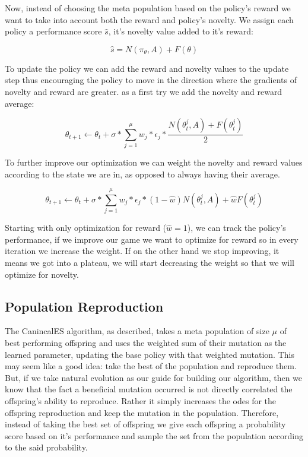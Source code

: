 \documentclass[11 pt, twocolumn]{article}
\begin{document}
Now, instead of choosing the meta population based on the policy's reward we want to take into account both the reward and policy's novelty. We assign each policy a performance score $\hat{s}$, it's novelty value added to it's reward:

\begin{equation*}
\hat{s}=N(\pi_\theta,A)+F(\theta)
\end{equation*}

To update the policy we can add the reward and novelty values to the update step thus encouraging the policy to move in the direction where the gradients of novelty and reward are greater. as a first try we add the novelty and reward average:

\begin{equation*}
\theta_{t+1}\gets\theta_t+\sigma*\sum_{j=1}^{\mu}w_j*\epsilon_j*\frac{N(\theta_t^j,A)+F(\theta_t^j)}{2}
\end{equation*}

To further improve our optimization we can weight the novelty and reward values according to the state we are in, as opposed to always having their average.

\begin{equation*}
\theta_{t+1}\gets\theta_t+\sigma*\sum_{j=1}^{\mu}w_j*\epsilon_j*(1-\hat{w})N(\theta_t^j,A)+\hat{w}F(\theta_t^j)
\end{equation*}

Starting with only optimization for reward ($\hat{w}=1$), we can track the policy's performance, if we improve our game we want to optimize for reward so in every iteration we increase the weight. If on the other hand we stop improving, it means we got into a plateau, we will start decreasing the weight so that we will optimize for novelty.

\subsection{Population Reproduction}
The CanincalES algorithm, as described, takes a meta population of size $\mu$ of best performing offspring and uses the weighted sum of their mutation as the learned parameter, updating the base policy with that weighted mutation. This may seem like a good idea: take the best of the population and reproduce them. But, if we take natural evolution as our guide for building our algorithm, then we know that the fact a beneficial mutation occurred is not directly correlated the offspring's ability to reproduce. Rather it simply increases the odes for the offspring reproduction and keep the mutation in the population. Therefore, instead of taking the best set of offspring we give each offspring a probability score based on it's performance and sample the set from the population according to the said probability.
\end{document}
